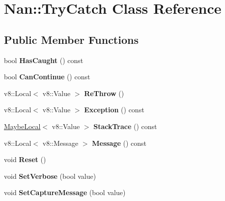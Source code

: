 \hypertarget{class_nan_1_1_try_catch}{}\section{Nan\+:\+:Try\+Catch Class Reference}
\label{class_nan_1_1_try_catch}
\subsection*{Public Member Functions}
\begin{DoxyCompactItemize}
\item 
\mbox{\label{class_nan_1_1_try_catch_aaab9bf297310cab79621b2349d837683}} 
bool {\bfseries Has\+Caught} () const
\item 
\mbox{\label{class_nan_1_1_try_catch_a34d429336bce31c9d6db7bdcd6d075b0}} 
bool {\bfseries Can\+Continue} () const
\item 
\mbox{\label{class_nan_1_1_try_catch_a336a25c3e39df8152f5b661bab60cefd}} 
v8\+::\+Local$<$ v8\+::\+Value $>$ {\bfseries Re\+Throw} ()
\item 
\mbox{\label{class_nan_1_1_try_catch_ace3bd53303259b1c65e195a51e0eac85}} 
v8\+::\+Local$<$ v8\+::\+Value $>$ {\bfseries Exception} () const
\item 
\mbox{\label{class_nan_1_1_try_catch_a750422d2897410d0ee5df2877d65075c}} 
\hyperlink{class_nan_1_1_maybe_local}{Maybe\+Local}$<$ v8\+::\+Value $>$ {\bfseries Stack\+Trace} () const
\item 
\mbox{\label{class_nan_1_1_try_catch_a3338b07d2ae3deee914626a4c215994b}} 
v8\+::\+Local$<$ v8\+::\+Message $>$ {\bfseries Message} () const
\item 
\mbox{\label{class_nan_1_1_try_catch_a22b614a4b6daa90e14ba80ccfdead44b}} 
void {\bfseries Reset} ()
\item 
\mbox{\label{class_nan_1_1_try_catch_a3d02c9ee904eca4ac93d043d0d30804d}} 
void {\bfseries Set\+Verbose} (bool value)
\item 
\mbox{\label{class_nan_1_1_try_catch_ade2413a313c18ecf390b805ce3c5dbaf}} 
void {\bfseries Set\+Capture\+Message} (bool value)
\end{DoxyCompactItemize}
